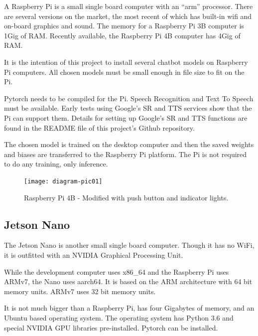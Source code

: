 A Raspberry Pi is a small single board computer with an ``arm'' processor. There are several versions on the market, the most recent of which has built-in wifi and on-board graphics and sound. The memory for a Raspberry Pi 3B computer is 1Gig of RAM. Recently available, the Raspberry Pi 4B computer has 4Gig of RAM.

It is the intention of this project to install several chatbot models on Raspberry Pi computers. All chosen models must be small enough in file size to fit on the Pi.

Pytorch needs to be compiled for the Pi. Speech Recognition and Text To Speech must be available. Early tests using Google\textquoteright s \ac{SR} and TTS services show that the Pi can support them. Details for setting up Google's SR and TTS functions are found in the README file of this project\textquoteright s Github repository.

The chosen model is trained on the desktop computer and then the saved weights and biases are transferred to the Raspberry Pi platform. The Pi is not required to do any training, only inference. 

\begin{figure}[H]
	\begin{center}
		\texttt{[image: diagram-pic01]}
		
		
	\end{center}
	\caption[Raspberry Pi]{Raspberry Pi 4B - Modified with push button and indicator lights.}
	
	
\end{figure}

\subsection{Jetson Nano}

The Jetson Nano is another small single board computer. Though it has no WiFi, it is outfitted with an NVIDIA Graphical Processing Unit. 

While the development computer uses x86\_64 and the Raspberry Pi uses ARMv7, the Nano uses aarch64. It is based on the ARM architecture with 64 bit memory units. ARMv7 uses 32 bit memory units.

It is not much bigger than a Raspberry Pi, has four Gigabytes of memory, and an Ubuntu based operating system. The operating system has Python 3.6 and special NVIDIA GPU libraries pre-installed. Pytorch can be installed.

